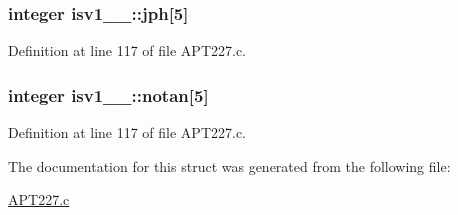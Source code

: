 \subsubsection[{\texorpdfstring{jph}{jph}}]{\setlength{\rightskip}{0pt plus 5cm}integer isv1\+\_\+\_\+\+::jph\mbox{[}5\mbox{]}}\hypertarget{structisv1__1___a6e3511a2de91294c859989060309b79e}{}\label{structisv1__1___a6e3511a2de91294c859989060309b79e}


Definition at line 117 of file A\+P\+T227.\+c.

\subsubsection[{\texorpdfstring{notan}{notan}}]{\setlength{\rightskip}{0pt plus 5cm}integer isv1\+\_\+\_\+\+::notan\mbox{[}5\mbox{]}}\hypertarget{structisv1__1___a1a7c5fc76d20170f74375b1ecd47183f}{}\label{structisv1__1___a1a7c5fc76d20170f74375b1ecd47183f}


Definition at line 117 of file A\+P\+T227.\+c.



The documentation for this struct was generated from the following file\+:\begin{DoxyCompactItemize}
\item 
\hyperlink{APT227_8c}{A\+P\+T227.\+c}\end{DoxyCompactItemize}
